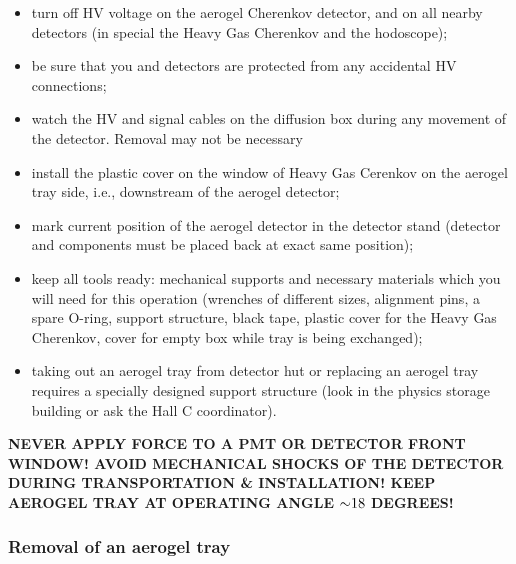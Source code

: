 {\begin{itemize}
  \item turn off HV voltage on the aerogel Cherenkov detector, and on
    all nearby detectors (in special the Heavy Gas Cherenkov and the
    hodoscope);
  \item be sure that you and detectors are protected from any
    accidental HV connections;
  \item watch the HV and signal cables on the diffusion box during any
    movement of the detector. Removal may not be necessary
  \item install the plastic cover on the window of Heavy Gas Cerenkov on the
    aerogel tray side, i.e., downstream of the aerogel detector;
  \item mark current position of the aerogel detector in the detector
    stand (detector and components must be placed back at exact same
    position);
  \item keep all tools ready: mechanical supports and necessary
    materials which you will need for this operation (wrenches of
    different sizes, alignment pins, a spare O-ring, support
    structure, black tape, plastic cover for the Heavy Gas Cherenkov,
    cover for empty box while tray is being exchanged);
  \item taking out an aerogel tray from detector hut or replacing an
    aerogel tray requires a specially designed support structure (look
    in the physics storage building or ask the Hall C coordinator).
    \end{itemize}

\textbf{NEVER APPLY FORCE TO A PMT OR DETECTOR
  FRONT WINDOW!  AVOID MECHANICAL SHOCKS OF THE DETECTOR DURING
  TRANSPORTATION \& INSTALLATION!  KEEP AEROGEL TRAY AT OPERATING ANGLE
  $\mathord{\sim} 18$ DEGREES!}

\subsubsection*{Removal of an aerogel tray}

}
